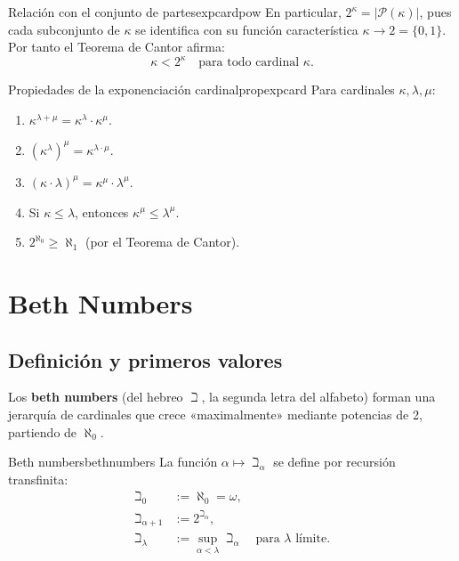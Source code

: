 \begin{observacion}{Relación con el conjunto de partes}{expcardpow}
En particular, $2^\kappa = |\mathcal{P}(\kappa)|$, pues cada subconjunto de $\kappa$ se identifica con su función característica $\kappa \to 2 = \{0,1\}$. Por tanto el Teorema de Cantor afirma:
\[
  \kappa < 2^\kappa \quad \text{para todo cardinal } \kappa.
\]
\end{observacion}

\begin{proposicion}{Propiedades de la exponenciación cardinal}{propexpcard}
Para cardinales $\kappa, \lambda, \mu$:
\begin{enumerate}[leftmargin=2em, label=(\roman*)]
  \item $\kappa^{\lambda + \mu} = \kappa^\lambda \cdot \kappa^\mu$.
  \item $(\kappa^\lambda)^\mu = \kappa^{\lambda \cdot \mu}$.
  \item $(\kappa \cdot \lambda)^\mu = \kappa^\mu \cdot \lambda^\mu$.
  \item Si $\kappa \leq \lambda$, entonces $\kappa^\mu \leq \lambda^\mu$.
  \item $2^{\aleph_0} \geq \aleph_1$ (por el Teorema de Cantor).
\end{enumerate}
\end{proposicion}

\section{Beth Numbers}

\subsection{Definición y primeros valores}

Los \textbf{beth numbers} (del hebreo $\beth$, la segunda letra del alfabeto) forman una jerarquía de cardinales que crece «maximalmente» mediante potencias de 2, partiendo de $\aleph_0$.

\begin{definicion}{Beth numbers}{bethnumbers}
La función $\alpha \mapsto \beth_\alpha$ se define por recursión transfinita:
\begin{align*}
  \beth_0 &:= \aleph_0 = \omega, \\
  \beth_{\alpha+1} &:= 2^{\beth_\alpha}, \\
  \beth_\lambda &:= \sup_{\alpha < \lambda} \beth_\alpha \quad \text{para } \lambda \text{ límite.}
\end{align*}
\end{definicion}

